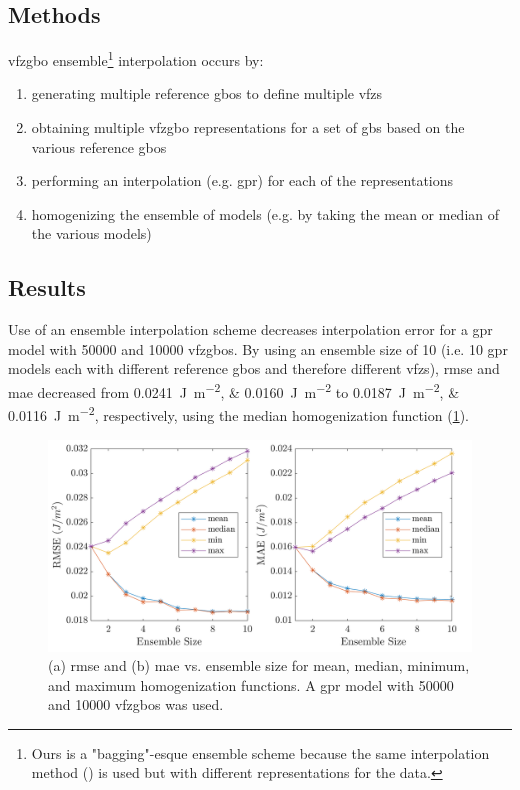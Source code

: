 \documentclass[preprint,12pt]{elsarticle}
\begin{document}
\subsection{Methods}
\label{sec:ensemble-interp:methods}
\Gls{vfzgbo} ensemble\footnote{Ours is a "bagging"-esque ensemble scheme because the same interpolation method () is used but with different representations for the \inpt{} data. } interpolation occurs by:
\begin{enumerate}
    \item generating multiple reference \glspl{gbo} to define multiple \glspl{vfz}
    \item obtaining multiple \gls{vfzgbo} representations for a set of \glspl{gb} based on the various reference \glspl{gbo}
    \item performing an interpolation (e.g. \gls{gpr}) for each of the representations
    \item homogenizing the ensemble of models (e.g. by taking the mean or median of the various models)
\end{enumerate}

\subsection{Results}
\label{sec:ensemble-interp:results}

Use of an ensemble interpolation scheme decreases interpolation error for a \gls{gpr} model with \num{50000} \inpt{} and \num{10000} \outpt{} \glspl{vfzgbo}. By using an ensemble size of 10 (i.e. 10 \gls{gpr} models each with different reference \glspl{gbo} and therefore different \glspl{vfz}), \gls{rmse} and \gls{mae} decreased from \SIlist{0.0241;0.0160}{\J\per\square\m} to \SIlist{0.0187;0.0116}{\J\per\square\m}, respectively, using the median homogenization function (\cref{fig:ensemble-interp-rmse-mae}). 
\begin{figure}
    \centering
    \includegraphics[scale=1]{figures/ensemble-interp-rmse-mae.png}
    \caption{(a) \Gls{rmse} and (b) \gls{mae} vs. ensemble size for mean, median, minimum, and maximum homogenization functions. A \gls{gpr} model with \num{50000} \inpt{} and \num{10000} \outpt{} \glspl{vfzgbo} was used. }
    \label{fig:ensemble-interp-rmse-mae}
\end{figure}
\end{document}
